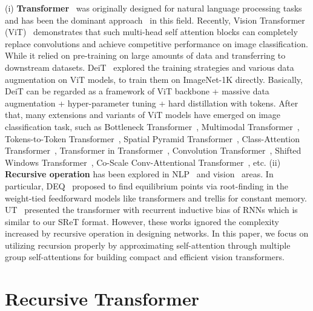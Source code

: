 \documentclass[runningheads]{llncs}
\begin{document}
	(i) \textbf{Transformer}~\cite{vaswani2017attention} was originally designed for natural language processing tasks and has been the dominant approach~\cite{devlin2019bert,yang2019xlnet,radford2019language,brown2020language,liu2019roberta} in this field. Recently, Vision Transformer (ViT)~\cite{dosovitskiy2021an} demonstrates that such multi-head self attention blocks can completely replace convolutions and achieve competitive performance on image classification. While it relied on pre-training on large amounts of data and transferring to downstream datasets. DeiT~\cite{touvron2020training} explored the training strategies and various data augmentation on ViT models, to train them on ImageNet-1K directly. Basically, DeiT can be regarded as a framework of ViT backbone + massive data augmentation + hyper-parameter tuning + hard distillation with tokens. After that, many extensions and variants of ViT models have emerged on image classification task, such as Bottleneck Transformer~\cite{srinivas2021bottleneck}, Multimodal Transformer~\cite{hendricks2021decoupling}, Tokens-to-Token Transformer~\cite{yuan2021tokens}, Spatial Pyramid Transformer~\cite{heo2021rethinking,wang2021pyramid}, Class-Attention Transformer~\cite{touvron2021going}, Transformer in Transformer~\cite{han2021transformer}, Convolution Transformer~\cite{wu2021cvt}, Shifted Windows Transformer~\cite{liu2021swin}, Co-Scale Conv-Attentional Transformer~\cite{xu2021co}, etc. 
	(ii) \textbf{Recursive operation} has been explored in NLP~\cite{liu2014recursive,dehghani2018universal,bai2018trellis,bai2019deep,bai2020multiscale,lan2019albert,pmlr-v139-chowdhury21a} and vision~\cite{liang2015recurrent,kim2016deeply,guo2019dynamic,liu2020cbnet} areas. In particular, DEQ~\cite{bai2019deep} proposed to find equilibrium points via root-finding in the weight-tied feedforward models like transformers and trellis for constant memory. UT~\cite{dehghani2018universal} presented the transformer with recurrent inductive bias of RNNs which is similar to our SReT format. However, these works ignored the complexity increased by recursive operation in designing networks. In this paper, we focus on utilizing recursion properly by approximating self-attention through multiple group self-attentions for building compact and efficient vision transformers.
	
	\section{Recursive Transformer} \label{main_method}
	
\end{document}
